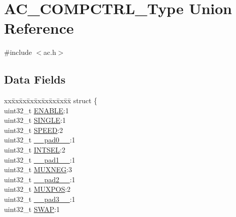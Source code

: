 \hypertarget{union_a_c___c_o_m_p_c_t_r_l___type}{}\section{A\+C\+\_\+\+C\+O\+M\+P\+C\+T\+R\+L\+\_\+\+Type Union Reference}
\label{union_a_c___c_o_m_p_c_t_r_l___type}


{\ttfamily \#include $<$ac.\+h$>$}

\subsection*{Data Fields}
\begin{DoxyCompactItemize}
\item 
\begin{tabbing}
xx\=xx\=xx\=xx\=xx\=xx\=xx\=xx\=xx\=\kill
struct \{\\
\>uint32\_t \mbox{\hyperlink{union_a_c___c_o_m_p_c_t_r_l___type_a66f979832c85e0692bd9422b05aff1f7}{ENABLE}}:1\\
\>uint32\_t \mbox{\hyperlink{union_a_c___c_o_m_p_c_t_r_l___type_a2c4b6a0d40a2cfd1999066ec5266d157}{SINGLE}}:1\\
\>uint32\_t \mbox{\hyperlink{union_a_c___c_o_m_p_c_t_r_l___type_ac9b7e20ad3da84dff4e0cdd8bf58e4a3}{SPEED}}:2\\
\>uint32\_t \mbox{\hyperlink{union_a_c___c_o_m_p_c_t_r_l___type_a3e57c2ef1c3ffb36722f000cc1156824}{\_\_pad0\_\_}}:1\\
\>uint32\_t \mbox{\hyperlink{union_a_c___c_o_m_p_c_t_r_l___type_a969883164592207b7a0bb4ae40a23ca9}{INTSEL}}:2\\
\>uint32\_t \mbox{\hyperlink{union_a_c___c_o_m_p_c_t_r_l___type_a6712ba6dd1d5b43d2d56ff8ac4e275a7}{\_\_pad1\_\_}}:1\\
\>uint32\_t \mbox{\hyperlink{union_a_c___c_o_m_p_c_t_r_l___type_a2455c611dbb03edeab3248cb16ef7c6f}{MUXNEG}}:3\\
\>uint32\_t \mbox{\hyperlink{union_a_c___c_o_m_p_c_t_r_l___type_a9ce12a63de64ef64ae2d59d128251cae}{\_\_pad2\_\_}}:1\\
\>uint32\_t \mbox{\hyperlink{union_a_c___c_o_m_p_c_t_r_l___type_a393cedfc831a74b6c60b3b2e1996b6e7}{MUXPOS}}:2\\
\>uint32\_t \mbox{\hyperlink{union_a_c___c_o_m_p_c_t_r_l___type_a4854608c0e776f0704a4d9a4b98ea57d}{\_\_pad3\_\_}}:1\\
\>uint32\_t \mbox{\hyperlink{union_a_c___c_o_m_p_c_t_r_l___type_a1b62068dd035ccd5f17ab503f8c2ac66}{SWAP}}:1\\

\end{tabbing}
\end{DoxyCompactItemize}
